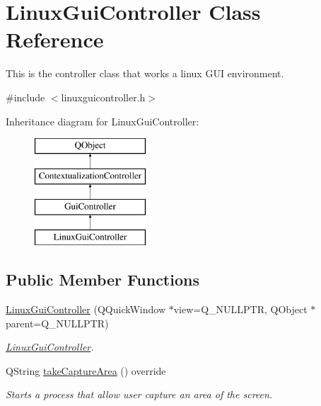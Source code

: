 \hypertarget{classLinuxGuiController}{}\section{Linux\+Gui\+Controller Class Reference}
\label{classLinuxGuiController}


This is the controller class that works a linux G\+UI environment.  




{\ttfamily \#include $<$linuxguicontroller.\+h$>$}

Inheritance diagram for Linux\+Gui\+Controller\+:\begin{figure}[H]
\begin{center}
\leavevmode
\includegraphics[height=4.000000cm]{classLinuxGuiController}
\end{center}
\end{figure}
\subsection*{Public Member Functions}
\begin{DoxyCompactItemize}
\item 
\mbox{\hyperlink{classLinuxGuiController_a26b28a0d7854973830048c9087a3cdf1}{Linux\+Gui\+Controller}} (Q\+Quick\+Window $\ast$view=Q\+\_\+\+N\+U\+L\+L\+P\+TR, Q\+Object $\ast$parent=Q\+\_\+\+N\+U\+L\+L\+P\+TR)
\begin{DoxyCompactList}\small\item\em \mbox{\hyperlink{classLinuxGuiController}{Linux\+Gui\+Controller}}. \end{DoxyCompactList}\item 
Q\+String \mbox{\hyperlink{classLinuxGuiController_a8242963a9c5f4b967902f8ee576294ec}{take\+Capture\+Area}} () override
\begin{DoxyCompactList}\small\item\em Starts a process that allow user capture an area of the screen. \end{DoxyCompactList}\end{DoxyCompactItemize}
